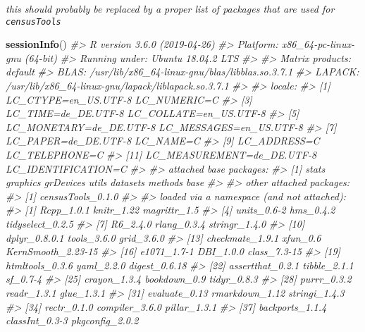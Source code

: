 \documentclass[12pt,]{article}
\newenvironment{Shaded}{}{}
\newcommand{\CommentTok}[1]{\textcolor[rgb]{0.38,0.63,0.69}{\textit{#1}}}
\newcommand{\KeywordTok}[1]{\textcolor[rgb]{0.00,0.44,0.13}{\textbf{#1}}}
\newcommand{\NormalTok}[1]{#1}
\begin{document}
\emph{this should probably be replaced by a proper list of packages that are used for \texttt{censusTools}}

\begin{Shaded}
\begin{Highlighting}[]
\KeywordTok{sessionInfo}\NormalTok{()}
\CommentTok{#> R version 3.6.0 (2019-04-26)}
\CommentTok{#> Platform: x86_64-pc-linux-gnu (64-bit)}
\CommentTok{#> Running under: Ubuntu 18.04.2 LTS}
\CommentTok{#> }
\CommentTok{#> Matrix products: default}
\CommentTok{#> BLAS:   /usr/lib/x86_64-linux-gnu/blas/libblas.so.3.7.1}
\CommentTok{#> LAPACK: /usr/lib/x86_64-linux-gnu/lapack/liblapack.so.3.7.1}
\CommentTok{#> }
\CommentTok{#> locale:}
\CommentTok{#>  [1] LC_CTYPE=en_US.UTF-8       LC_NUMERIC=C              }
\CommentTok{#>  [3] LC_TIME=de_DE.UTF-8        LC_COLLATE=en_US.UTF-8    }
\CommentTok{#>  [5] LC_MONETARY=de_DE.UTF-8    LC_MESSAGES=en_US.UTF-8   }
\CommentTok{#>  [7] LC_PAPER=de_DE.UTF-8       LC_NAME=C                 }
\CommentTok{#>  [9] LC_ADDRESS=C               LC_TELEPHONE=C            }
\CommentTok{#> [11] LC_MEASUREMENT=de_DE.UTF-8 LC_IDENTIFICATION=C       }
\CommentTok{#> }
\CommentTok{#> attached base packages:}
\CommentTok{#> [1] stats     graphics  grDevices utils     datasets  methods   base     }
\CommentTok{#> }
\CommentTok{#> other attached packages:}
\CommentTok{#> [1] censusTools_0.1.0}
\CommentTok{#> }
\CommentTok{#> loaded via a namespace (and not attached):}
\CommentTok{#>  [1] Rcpp_1.0.1         knitr_1.22         magrittr_1.5      }
\CommentTok{#>  [4] units_0.6-2        hms_0.4.2          tidyselect_0.2.5  }
\CommentTok{#>  [7] R6_2.4.0           rlang_0.3.4        stringr_1.4.0     }
\CommentTok{#> [10] dplyr_0.8.0.1      tools_3.6.0        grid_3.6.0        }
\CommentTok{#> [13] checkmate_1.9.1    xfun_0.6           KernSmooth_2.23-15}
\CommentTok{#> [16] e1071_1.7-1        DBI_1.0.0          class_7.3-15      }
\CommentTok{#> [19] htmltools_0.3.6    yaml_2.2.0         digest_0.6.18     }
\CommentTok{#> [22] assertthat_0.2.1   tibble_2.1.1       sf_0.7-4          }
\CommentTok{#> [25] crayon_1.3.4       bookdown_0.9       tidyr_0.8.3       }
\CommentTok{#> [28] purrr_0.3.2        readr_1.3.1        glue_1.3.1        }
\CommentTok{#> [31] evaluate_0.13      rmarkdown_1.12     stringi_1.4.3     }
\CommentTok{#> [34] rectr_0.1.0        compiler_3.6.0     pillar_1.3.1      }
\CommentTok{#> [37] backports_1.1.4    classInt_0.3-3     pkgconfig_2.0.2}
\end{Highlighting}
\end{Shaded}
\end{document}
